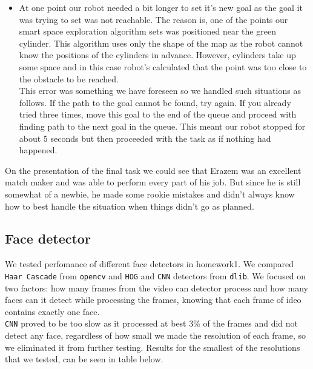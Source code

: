 \documentclass[12pt,a4paper]{article}
\begin{document}
\begin{itemize}
		\item At one point our robot needed a bit longer to set it's new goal as the goal it was trying to set was not reachable. The reason is, one of the points our smart space exploration algorithm sets was positioned near the green cylinder. This algorithm uses only the shape of the map as the robot cannot know the positions of the cylinders in advance. However, cylinders take up some space and in this case robot's calculated that the point was too close to the obstacle to be reached. \\
		This error was something we have foreseen so we handled such situations as follows. If the path to the goal cannot be found, try again. If you already tried three times, move this goal to the end of the queue and proceed with finding path to the next goal in the queue. This meant our robot stopped for about 5 seconds but then proceeded with the task as if nothing had happened.
	\end{itemize}

	On the presentation of the final task we could see that Erazem was an excellent match maker and was able to perform every part of his job. But since he is still somewhat of a newbie, he made some rookie mistakes and didn't always know how to best handle the situation when things didn't go as planned.

	\subsection{Face detector}
	We tested perfomance of different face detectors in homework1. We compared \texttt{Haar Cascade} from \texttt{opencv} and \texttt{HOG} and \texttt{CNN} detectors from \texttt{dlib}. We focused on two factors: how many frames from the video can detector process and how many faces can it detect while processing the frames, knowing that each frame of ideo contains exactly one face. \\ 
	
	\texttt{CNN} proved to be too slow as it processed at best 3\% of the frames and did not detect any face, regardless of how small we made the resolution of each frame, so we eliminated it from further testing. Results for the smallest of the resolutions that we tested, can be seen in table below. \\
\end{document}
